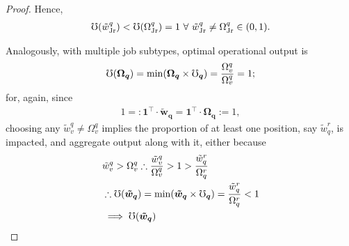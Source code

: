 \documentclass[hidelinks, nonatbib]{elsarticle}
\begin{document}
\begin{lemma}
\begin{proof}
        Hence, 
        \begin{gather}
            \mho(\tilde{w}_{\text{Jr}}^{q}) < 
            \mho(\Omega_{\text{Jr}}^{q}) 
            = 1
            \
            \forall
            \
            \tilde{w}_{\text{Jr}}^{q}
            \neq
            \Omega_{\text{Jr}}^{q}
            \in 
            (0,1)
            .
        \end{gather}
        
        Analogously, with multiple job subtypes, optimal operational output is
        \begin{gather}
            \mho(\boldsymbol{\Omega_q})
            = 
            \min(
                \boldsymbol{\Omega_q}
                \times
                \boldsymbol{\mho_q}
            )
            =
            \frac{
                \Omega_{v}^{q}
            }{
                \Omega_{v}^{q}
            }
            =
            1
            ;
        \end{gather}
        for, again, since
        \begin{gather}
            1
            =:
            \boldsymbol{1} ^ {\top}
            \cdot
            \boldsymbol{\tilde{w}_{q}}
            =
            \boldsymbol{1} ^ {\top}
            \cdot
            \boldsymbol{\Omega_{q}}
            := 1
            ,
        \end{gather}
        choosing any $\tilde{w}_{v}^{q} \neq \Omega_{v}^{q}$ implies the proportion of at least one position, say $\tilde{w}_{q}^{r}$, is impacted, and aggregate output along with it, either because
        \begin{align}
            &
            \tilde{w}_{v}^{q} > \Omega_{v}^{q}
            \therefore
            \frac{
                \tilde{w}_{v}^{q}
            }{
                \Omega_{v}^{q}
            }
            > 
            1
            > 
            \frac{
                \tilde{w}_{q}^{r}
            }{
                \Omega_{q}^{r}
            }
            \\
            &\therefore
            \oo(\boldsymbol{\tilde{w}_q})
            = 
            \min(
                \boldsymbol{\tilde{w}_q}
                \times
                \boldsymbol{\oo_q}
            )
            =
            \frac{
                \tilde{w}_{q}^{r}
            }{
                \Omega_{q}^{r}
            }
            < 
            1
            \\
            &
            \implies
            \oo(\boldsymbol{\tilde{w}_q})

\end{align}
\end{proof}
\end{lemma}
\end{document}
